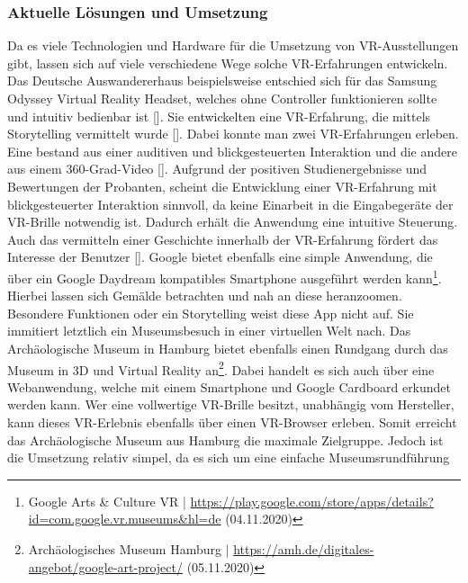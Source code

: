 \documentclass[a4paper,12pt,oneside]{article}
\begin{document}
      \subsubsection{Aktuelle Lösungen und Umsetzung} \label{Aktuelle Lösungen und Umsetzung}
        Da es viele Technologien und Hardware für die Umsetzung von VR-Ausstellungen 
        gibt, lassen sich auf viele verschiedene Wege solche VR-Erfahrungen entwickeln.
        Das Deutsche Auswandererhaus beispielsweise entschied sich für das Samsung Odyssey
        Virtual Reality Headset, welches ohne Controller funktionieren sollte und intuitiv
        bedienbar ist [\cite[35]{Heidsiek2019}]. Sie entwickelten eine VR-Erfahrung, die
        mittels Storytelling vermittelt wurde [\cite[35-39]{Heidsiek2019}]. Dabei
        konnte man zwei VR-Erfahrungen erleben. Eine bestand aus einer auditiven und
        blickgesteuerten Interaktion und die andere aus einem 360-Grad-Video [\cite[38]{Heidsiek2019}].
        Aufgrund der positiven Studienergebnisse und Bewertungen der Probanten, scheint
        die Entwicklung einer VR-Erfahrung mit blickgesteuerter Interaktion sinnvoll, da
        keine Einarbeit in die Eingabegeräte der VR-Brille notwendig ist. Dadurch erhält
        die Anwendung eine intuitive Steuerung. Auch das vermitteln einer Geschichte 
        innerhalb der VR-Erfahrung fördert das Interesse der Benutzer [\cite[35-39]{Heidsiek2019}].
        Google bietet ebenfalls eine simple Anwendung, die über ein Google Daydream
        kompatibles Smartphone ausgeführt werden kann\footnote{Google Arts \& Culture VR | \url{https://play.google.com/store/apps/details?id=com.google.vr.museums&hl=de} (04.11.2020)}.
        Hierbei lassen sich Gemälde betrachten und nah an diese heranzoomen.
        Besondere Funktionen oder ein Storytelling weist diese App nicht auf. Sie immitiert
        letztlich ein Museumsbesuch in einer virtuellen Welt nach.
        Das Archäologische Museum in Hamburg bietet ebenfalls einen Rundgang durch
        das Museum in 3D und Virtual Reality an\footnote{Archäologisches Museum Hamburg | \url{https://amh.de/digitales-angebot/google-art-project/} (05.11.2020)}.
        Dabei handelt es sich auch über eine Webanwendung, welche mit einem Smartphone und
        Google Cardboard erkundet werden kann. Wer eine vollwertige VR-Brille besitzt,
        unabhängig vom Hersteller, kann dieses VR-Erlebnis ebenfalls über einen VR-Browser
        erleben. Somit erreicht das Archäologische Museum aus Hamburg die maximale Zielgruppe.
        Jedoch ist die Umsetzung relativ simpel, da es sich um eine einfache Museumsrundführung
\end{document}
